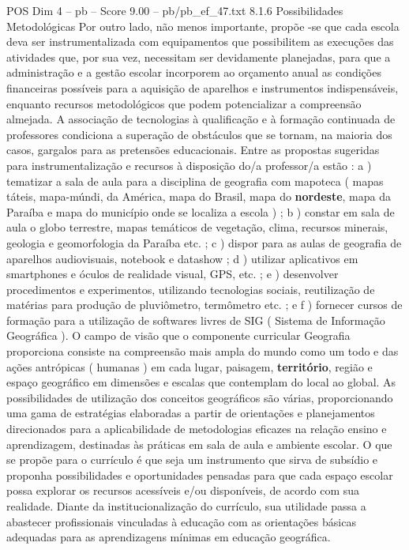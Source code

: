 \begin{textsample}{POS Dim 4 – pb – Score 9.00 – pb/pb\_ef\_47.txt}  \label{ex:f4_pos_264}
8.1.6 Possibilidades Metodológicas Por outro lado, não menos importante, propõe -se que cada escola deva ser instrumentalizada com equipamentos que possibilitem as execuções das atividades que, por sua vez, necessitam ser devidamente planejadas, para que a administração e a gestão escolar incorporem ao orçamento anual as condições financeiras possíveis para a aquisição de aparelhos e instrumentos indispensáveis, enquanto recursos metodológicos que podem potencializar a compreensão almejada.
A associação de tecnologias à qualificação e à formação continuada de professores condiciona a superação de obstáculos que se tornam, na maioria dos casos, gargalos para as pretensões educacionais.
Entre as propostas sugeridas para instrumentalização e recursos à disposição do/a professor/a estão : a ) tematizar a sala de aula para a disciplina de geografia com mapoteca ( mapas táteis, mapa-múndi, da América, mapa do Brasil, mapa do \textbf{nordeste}, mapa da Paraíba e mapa do município onde se localiza a escola ) ; b ) constar em sala de aula o globo terrestre, mapas temáticos de vegetação, clima, recursos minerais, geologia e geomorfologia da Paraíba etc. ; c ) dispor para as aulas de geografia de aparelhos audiovisuais, notebook e datashow ; d ) utilizar aplicativos em smartphones e óculos de realidade visual, GPS, etc. ; e ) desenvolver procedimentos e experimentos, utilizando tecnologias sociais, reutilização de matérias para produção de pluviômetro, termômetro etc. ; e f ) fornecer cursos de formação para a utilização de softwares livres de SIG ( Sistema de Informação Geográfica ).
O campo de visão que o componente curricular Geografia proporciona consiste na compreensão mais ampla do mundo como um todo e das ações antrópicas ( humanas ) em cada lugar, paisagem, \textbf{território}, região e espaço geográfico em dimensões e escalas que contemplam do local ao global.
As possibilidades de utilização dos conceitos geográficos são várias, proporcionando uma gama de estratégias elaboradas a partir de orientações e planejamentos direcionados para a aplicabilidade de metodologias eficazes na relação ensino e aprendizagem, destinadas às práticas em sala de aula e ambiente escolar.
O que se propõe para o currículo é que seja um instrumento que sirva de subsídio e proponha possibilidades e oportunidades pensadas para que cada espaço escolar possa explorar os recursos acessíveis e/ou disponíveis, de acordo com sua realidade.
Diante da institucionalização do currículo, sua utilidade passa a abastecer profissionais vinculadas à educação com as orientações básicas adequadas para as aprendizagens mínimas em educação geográfica.

\end{textsample}
